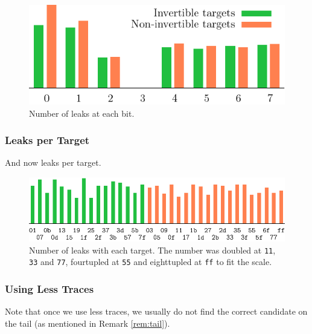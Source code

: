 	\begin{figure}[h]
	\begin{center}
		\includegraphics{figures/leak_bit/plot.pdf}
		\caption{Number of leaks at each bit.}
		\label{fig:leakbithist}
	\end{center}
	\end{figure}

\subsubsection{Leaks per Target}
	
	And now leaks per target.
	
	\begin{figure}[h]
	\begin{center}
		\includegraphics{figures/leak_target/plot.pdf}
		\caption{Number of leaks with each target. The number was doubled at {\tt 11}, {\tt 33} and {\tt 77}, fourtupled at {\tt 55} and eighttupled at {\tt ff} to fit the scale.}
		\label{fig:leaktargethist}
	\end{center}
	\end{figure}

\subsubsection{Using Less Traces}
	
	Note that once we use less traces, we usually do not find the correct candidate on the tail (as mentioned in Remark \ref{rem:tail}). %


